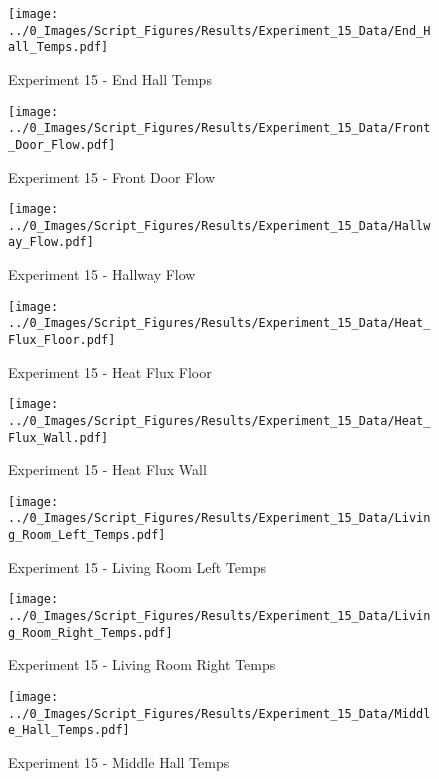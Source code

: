 	\clearpage

	\begin{figure}[H]
		\centering
		\texttt{[image: ../0\_Images/Script\_Figures/Results/Experiment\_15\_Data/End\_Hall\_Temps.pdf]}
		\caption[]{Experiment 15 - End Hall Temps}
	\end{figure}
 

	\begin{figure}[H]
		\centering
		\texttt{[image: ../0\_Images/Script\_Figures/Results/Experiment\_15\_Data/Front\_Door\_Flow.pdf]}
		\caption[]{Experiment 15 - Front Door Flow}
	\end{figure}
 
	\clearpage

	\begin{figure}[H]
		\centering
		\texttt{[image: ../0\_Images/Script\_Figures/Results/Experiment\_15\_Data/Hallway\_Flow.pdf]}
		\caption[]{Experiment 15 - Hallway Flow}
	\end{figure}
 

	\begin{figure}[H]
		\centering
		\texttt{[image: ../0\_Images/Script\_Figures/Results/Experiment\_15\_Data/Heat\_Flux\_Floor.pdf]}
		\caption[]{Experiment 15 - Heat Flux Floor}
	\end{figure}
 
	\clearpage

	\begin{figure}[H]
		\centering
		\texttt{[image: ../0\_Images/Script\_Figures/Results/Experiment\_15\_Data/Heat\_Flux\_Wall.pdf]}
		\caption[]{Experiment 15 - Heat Flux Wall}
	\end{figure}
 

	\begin{figure}[H]
		\centering
		\texttt{[image: ../0\_Images/Script\_Figures/Results/Experiment\_15\_Data/Living\_Room\_Left\_Temps.pdf]}
		\caption[]{Experiment 15 - Living Room Left Temps}
	\end{figure}
 
	\clearpage

	\begin{figure}[H]
		\centering
		\texttt{[image: ../0\_Images/Script\_Figures/Results/Experiment\_15\_Data/Living\_Room\_Right\_Temps.pdf]}
		\caption[]{Experiment 15 - Living Room Right Temps}
	\end{figure}
 

	\begin{figure}[H]
		\centering
		\texttt{[image: ../0\_Images/Script\_Figures/Results/Experiment\_15\_Data/Middle\_Hall\_Temps.pdf]}
		\caption[]{Experiment 15 - Middle Hall Temps}
	\end{figure}
 
